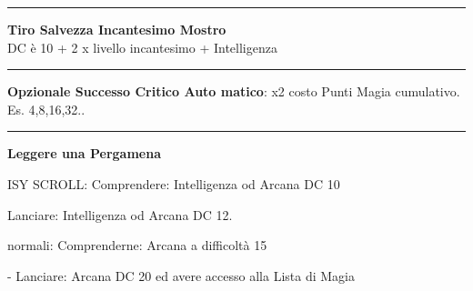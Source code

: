 \documentclass[a4paper,12 pt,openany]{book}
\newcommand{\riga}{\rule{\textwidth}{0.4pt}}
\begin{document}
\begin{textblock*}{5cm}
\riga

\textbf{Tiro Salvezza Incantesimo Mostro}\\
DC è 10 + 2 x livello incantesimo + Intelligenza

\riga

\textbf{Opzionale Successo Critico Auto matico}:  x2 costo Punti Magia cumulativo. Es. 4,8,16,32..

\riga

\textbf{Leggere una Pergamena}
	
	ISY SCROLL: Comprendere: Intelligenza od Arcana DC 10
	
	Lanciare: Intelligenza od Arcana DC 12.
	
	normali: Comprenderne: Arcana a difficoltà 15
	
	- Lanciare: Arcana DC 20 ed avere accesso alla Lista di Magia

\end{textblock*}
\end{document}
